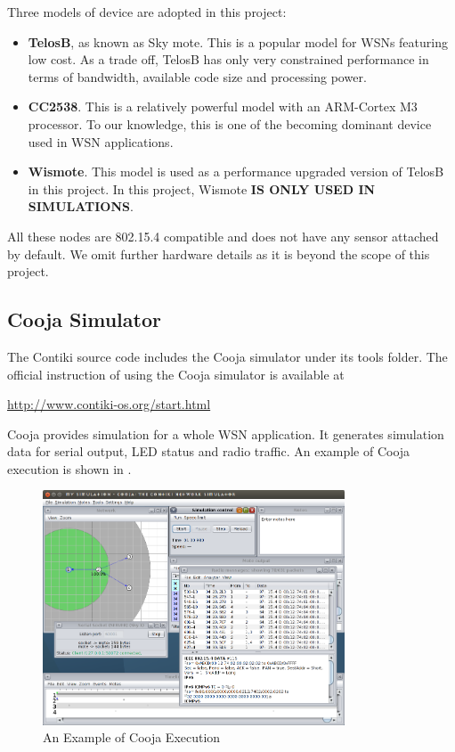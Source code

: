 Three models of device are adopted in this project:

\begin{itemize}
	\item \textbf{TelosB}\cite{TelosB}, as known as Sky mote. This is a popular model for WSNs featuring low cost. As a trade off, TelosB has only very constrained performance in terms of bandwidth, available code size and processing power.
	
	\item \textbf{CC2538}\cite{CC2538}. This is a relatively powerful model with an ARM-Cortex M3 processor. To our knowledge, this is one of the becoming dominant device used in WSN applications.
	
	\item \textbf{Wismote}\cite{Wismote}. This model is used as a performance upgraded version of TelosB in this project. In this project, Wismote \textbf{IS ONLY USED IN SIMULATIONS}. 
\end{itemize}

All these nodes are 802.15.4\cite{802154} compatible and does not have any sensor attached by default. We omit further hardware details as it is beyond the scope of this project. 

\subsection{Cooja Simulator}

The Contiki source code includes the Cooja simulator under its tools folder. The official instruction of using the Cooja simulator is available at 

\begin{center}
	\url{http://www.contiki-os.org/start.html}
\end{center}

Cooja provides simulation for a whole WSN application. It generates simulation data for serial output, LED status and radio traffic. An example of Cooja execution is shown in .

\begin{figure}[h!]
	\center
	\includegraphics[width=0.8\textwidth]{fig/cooja_example.png}
	\caption{An Example of Cooja Execution}
	\label{Fig: An Example of Cooja Execution}
\end{figure}


